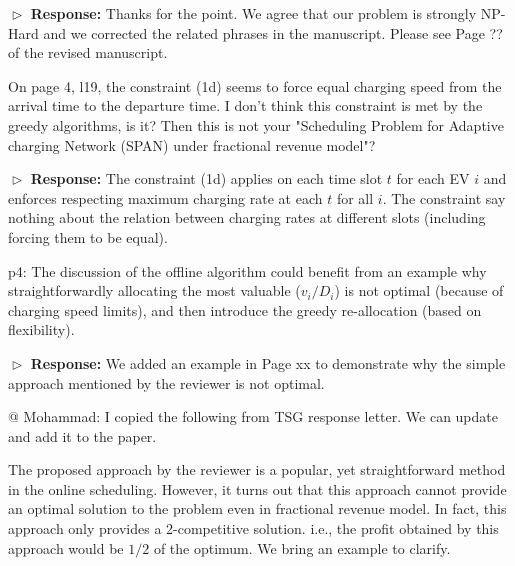 \documentclass[11pt]{article}
\begin{document}
$\vartriangleright$ \noindent\textbf{Response:} 
Thanks for the point. We agree that our problem is strongly NP-Hard and we corrected the related phrases in the manuscript. Please see Page ?? of the revised manuscript. 

\vspace{3mm}
{\color{blue} On page 4, l19, the constraint (1d) seems to force equal charging speed from the arrival time to the departure time. I don't think this constraint is met by the greedy algorithms, is it? Then this is not your "Scheduling Problem for Adaptive charging Network (SPAN) under fractional revenue model"? }
\vspace{3mm}

$\vartriangleright$ \noindent\textbf{Response:} 
The constraint (1d) applies on each time slot $t$ for each EV $i$ and enforces respecting maximum charging rate at each $t$ for all $i$. The constraint say nothing about the relation between charging rates at different slots (including forcing them to be equal).

\vspace{3mm}
{\color{blue} p4: The discussion of the offline algorithm could benefit from an example why straightforwardly allocating the most valuable ($v_i/D_i$) is not optimal (because of charging speed limits), and then introduce the greedy re-allocation (based on flexibility). }
\vspace{3mm}

$\vartriangleright$ \noindent\textbf{Response:} 
We added an example in Page xx to demonstrate why the simple approach mentioned by the reviewer is not optimal.

{\color{red}@ Mohammad: I copied the following from TSG response letter. We can update and add it to the paper.}

The proposed approach by the reviewer is a popular, yet straightforward method in the online scheduling. However, it turns out that this approach cannot provide an optimal solution to the problem even in fractional revenue model. In fact, this approach only provides a 2-competitive solution. i.e., the profit obtained by this approach would be $1/2$ of the optimum. We bring an example to clarify.
\end{document}

